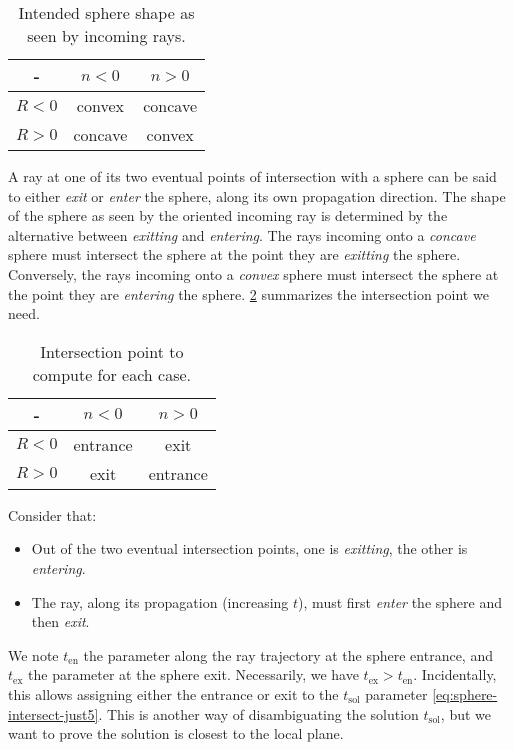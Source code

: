 \begin{table} \caption{\label{tab:sphere-definition-cases} Intended sphere
shape as seen by incoming rays.}
\begin{tabular}{| c | c | c |} \hline
-       & $n < 0$ & $n > 0$ \\ \hline
$R < 0$ & convex  & concave \\ \hline
$R > 0$ & concave & convex  \\
\hline \end{tabular} \end{table}

A ray at one of its two eventual points of intersection with a sphere can be
said to either \emph{exit} or \emph{enter} the sphere, along its own
propagation direction. The shape of the sphere as seen by the oriented incoming
ray is determined by the alternative between \emph{exitting} and
\emph{entering}.  The rays incoming onto a \emph{concave} sphere must intersect
the sphere at the point they are \emph{exitting} the sphere.  Conversely, the
rays incoming onto a \emph{convex} sphere must intersect the sphere at the
point they are \emph{entering} the sphere. \cref{tab:sphere-exit-entrance}
summarizes the intersection point we need.

\begin{table} \caption{\label{tab:sphere-exit-entrance} Intersection point
to compute for each case.}
\begin{tabular}{| c | c | c |} \hline
-       & $n < 0$   & $n > 0$  \\ \hline
$R < 0$ & entrance  & exit     \\ \hline
$R > 0$ & exit      & entrance \\
\hline \end{tabular} \end{table}

Consider that: \begin{itemize}
\item Out of the two eventual intersection points, one is \emph{exitting},
the other is \emph{entering}.
\item The ray, along its propagation (increasing $t$), must first \emph{enter}
the sphere and then \emph{exit}.
\end{itemize}

We note $t_\textrm{en}$ the parameter along the ray trajectory at the sphere
entrance, and $t_\textrm{ex}$ the parameter at the sphere exit. Necessarily,
we have $t_\textrm{ex} > t_\textrm{en}$. Incidentally, this allows assigning
either the entrance or exit to the $t_\textrm{sol}$ parameter
\cref{eq:sphere-intersect-just5}. This is another way of disambiguating the
solution $t_\textrm{sol}$, but we want to prove the solution is closest to the
local plane.

